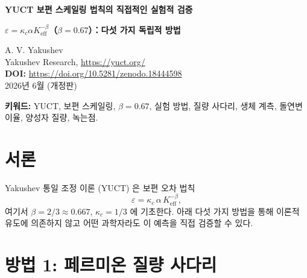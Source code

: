 \documentclass[12pt,a4paper]{article}
\newcommand{\Ke}{K_{\mathrm{eff}}}
\begin{document}
	
	\begin{center}
		{\Large \textbf{YUCT 보편 스케일링 법칙의 직접적인 실험적 검증}}
	\end{center}
	\begin{center}
		{\Large \textbf{\(\varepsilon = \kappa_c \alpha \Ke^{-\beta}\)（\(\beta = 0.67\)）：다섯 가지 독립적 방법}}
	\end{center}
	
	\vspace{0.5cm}
	\noindent
	A. V. Yakushev\\
	Yakushev Research, \url{https://yuct.org/}\\
	\vspace{0.3cm}
	\textbf{DOI:} \url{https://doi.org/10.5281/zenodo.18444598}\\
	\noindent
	2026년 6월 (개정판)
	
	\vspace{0.5cm}
	
	\begin{abstract}
		\noindent
		본 노트는 Yakushev 통일 조정 이론 (YUCT) 의 핵심 예측인 보편 오차 스케일링 지수 \(\beta = 0.67\) 을 직접 확인할 수 있는 다섯 가지 독립적이고 수치적으로 검증된 실험 방법을 제시한다. 각 방법은 공개된 데이터만 사용하며, 계산기만 필요로 하고, 학부생이 한 번의 오후에 재현할 수 있다. 검증은 입자 물리학, 생물학, 진화 유전학, 재료 과학에 걸쳐 있다.
	\end{abstract}
	
	\vspace{0.5cm}
	
	\noindent
	\textbf{키워드:} YUCT, 보편 스케일링, \(\beta = 0.67\), 실험 방법, 질량 사다리, 생체 계측, 돌연변이율, 양성자 질량, 녹는점.
	
	\section{서론}
	
	Yakushev 통일 조정 이론 (YUCT) 은 보편 오차 법칙
	\begin{equation}\label{eq:error-law}
		\varepsilon = \kappa_c \, \alpha \, \Ke^{-\beta},
	\end{equation}
	여기서 \(\beta = 2/3 \approx 0.667\), \(\kappa_c = 1/3\) 에 기초한다. 아래 다섯 가지 방법을 통해 이론적 유도에 의존하지 않고 어떤 과학자라도 이 예측을 직접 검증할 수 있다.
	
	\section{방법 1: 페르미온 질량 사다리}
	\label{sec:massladder}
	
\end{document}
